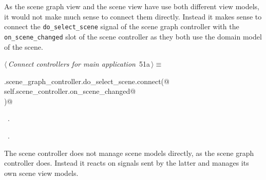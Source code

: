 \documentclass[
    a4paper,      %
    10pt,         %
    openright,    %
    notitlepage,  %
    parskip=half, %
]{scrreprt}       %
\theoremstyle{definition}                    %
\begin{document}
As the scene graph view and the scene view have use both different view models,
it would not make much sense to connect them directly. Instead it makes sense to
connect the \verb+do_select_scene+ signal of the scene graph controller with the
\verb+on_scene_changed+ slot of the scene controller as they both use the
domain model of the scene.

\begin{flushleft} \small
\begin{minipage}{\linewidth}\label{scrap76}\raggedright\small
{} $\langle\,${\itshape Connect controllers for main application}\nobreak\ {\footnotesize {51a}}$\,\rangle\equiv$
\vspace{-1ex}
\begin{list}{}{} \item
\mbox{}\lstinline@self.scene_graph_controller.do_select_scene.connect(@\\
\mbox{}\lstinline@    self.scene_controller.on_scene_changed@\\
\mbox{}\lstinline@)@{\NWsep}
\end{list}
\vspace{-1.5ex}
\footnotesize
\begin{list}{}{\setlength{\itemsep}{-\parsep}\setlength{\itemindent}{-\leftmargin}}
\item \NWtxtMacroDefBy\ .
\item \NWtxtMacroRefIn\ .

\item{}
\end{list}
\end{minipage}\vspace{4ex}
\end{flushleft}
The scene controller does not manage scene models directly, as the scene graph
controller does. Instead it reacts on signals sent by the latter and manages
its own scene view models.
\end{document}
